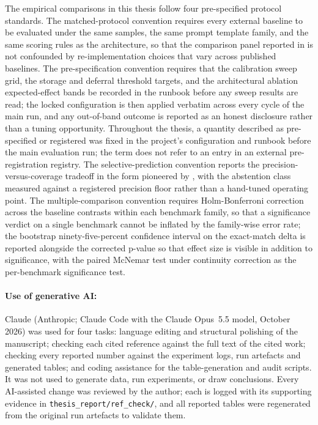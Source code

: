 The empirical comparisons in this thesis follow four pre-specified protocol standards. The matched-protocol convention requires every external baseline to be evaluated under the same samples, the same prompt template family, and the same scoring rules as the architecture, so that the comparison panel reported in  is not confounded by re-implementation choices that vary across published baselines. The pre-specification convention requires that the calibration sweep grid, the storage and deferral threshold targets, and the architectural ablation expected-effect bands be recorded in the runbook before any sweep results are read; the locked configuration is then applied verbatim across every cycle of the main run, and any out-of-band outcome is reported as an honest disclosure rather than a tuning opportunity. Throughout the thesis, a quantity described as pre-specified or registered was fixed in the project's configuration and runbook before the main evaluation run; the term does not refer to an entry in an external pre-registration registry. The selective-prediction convention reports the precision-versus-coverage tradeoff in the form pioneered by \cite{kamath2020selective}, with the abstention class measured against a registered precision floor rather than a hand-tuned operating point. The multiple-comparison convention requires Holm-Bonferroni correction \cite{holm1979simple} across the baseline contrasts within each benchmark family, so that a significance verdict on a single benchmark cannot be inflated by the family-wise error rate; the bootstrap ninety-five-percent confidence interval on the exact-match delta is reported alongside the corrected p-value so that effect size is visible in addition to significance, with the paired McNemar test under continuity correction \cite{edwards1948note} as the per-benchmark significance test.

\paragraph{Use of generative AI:} Claude (Anthropic; Claude Code with the Claude Opus~5.5 model, October 2026) was used for four tasks: language editing and structural polishing of the manuscript; checking each cited reference against the full text of the cited work; checking every reported number against the experiment logs, run artefacts and generated tables; and coding assistance for the table-generation and audit scripts. It was not used to generate data, run experiments, or draw conclusions. Every AI-assisted change was reviewed by the author; each is logged with its supporting evidence in \texttt{thesis\_report/ref\_check/}, and all reported tables were regenerated from the original run artefacts to validate them.

